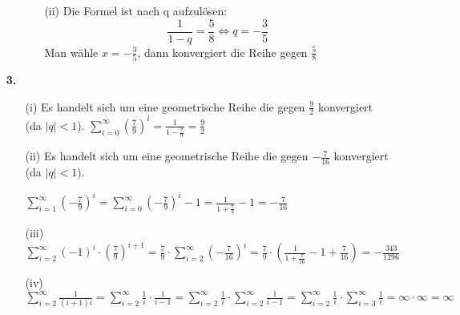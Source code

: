 \documentclass[a4paper,11pt]{scrartcl}
\newcommand{\bra}[1]{\left(#1\right)}
\newcommand{\rowi}[1]{\sum_{i=#1}^{\infty}}
\newcommand{\row}{\rowi{0}}
\begin{document}
\begin{enumerate}
\begin{enumerate}
\begin{enumerate}
                    \item[(ii)]
                        Die Formel ist nach q aufzulösen:
                        $$\frac{1}{1-q}=\frac{5}{8} \Leftrightarrow q=-\frac{3}{5}$$
                        Man wähle $x=-\frac{3}{5}$, dann konvergiert die Reihe gegen $\frac{5}{8}$
                \end{enumerate}

        \end{enumerate}
    \item[\textbf{3.}]
        \begin{enumerate}
            \item[(i)]
                Es handelt sich um eine geometrische Reihe die gegen $\frac{9}{2}$
                konvergiert (da $|q| < 1$).
                $\displaystyle
                \sum_{i=0}^{\infty}\left(\frac{7}{9}\right)^i
                = \frac{1}{1-\frac{7}{9}}= \frac{9}{2}
                $

            \item[(ii)]
                Es handelt sich um eine geometrische Reihe die gegen $-\frac{7}{16}$
                konvergiert (da $|q| < 1$).

                $\displaystyle
                \rowi{1}\bra{-\frac{7}{9}}^i
                = \row\bra{-\frac{7}{9}}^i - 1
                = \frac{1}{1 + \frac{7}{9}} - 1
                = -\frac{7}{16}
                $

            \item[(iii)]
                $\displaystyle
                \rowi{2}(-1)^i \cdot \bra{\frac{7}{9}}^{i+1}
                = \frac{7}{9} \cdot \rowi{2}\bra{-\frac{7}{16}}^i
                = \frac{7}{9} \cdot \bra{ \frac{1}{1 + \frac{7}{16}} - 1 + \frac{7}{16}}
                = -\frac{343}{1296}
                $

            \item[(iv)]
                $\displaystyle
                \rowi{2}\frac{1}{(i + 1)i}
                = \rowi{2}\frac{1}{i} \cdot \frac{1}{i - 1}
                = \rowi{2}\frac{1}{i} \cdot \rowi{2}\frac{1}{i - 1}
                = \rowi{2}\frac{1}{i} \cdot \rowi{3}\frac{1}{i}
                = \infty \cdot \infty = \infty
                $

        \end{enumerate}


\end{enumerate}
\end{document}
